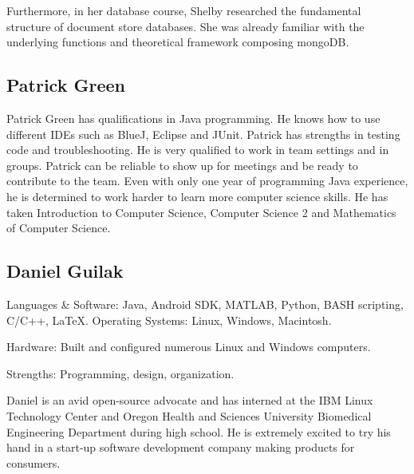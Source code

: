 \documentclass[letterpaper,12pt]{article}
\begin{document}
	Furthermore, in her database course, Shelby researched the fundamental structure of document store databases. She was already familiar with the underlying functions and theoretical framework composing mongoDB.
\subsection{Patrick Green}
	Patrick Green has qualifications in Java programming. He knows how to use different IDEs such as BlueJ, Eclipse and JUnit. Patrick has strengths in testing code and troubleshooting. He is very qualified to work in team settings and in groups. Patrick can be reliable to show up for meetings and be ready to contribute to the team. Even with only one year of programming Java experience, he is determined to work harder to learn more computer science skills. He has taken Introduction to Computer Science, Computer Science 2 and Mathematics of Computer Science.
\subsection{Daniel Guilak}
Languages \& Software: Java, Android SDK, MATLAB, Python, BASH scripting, C/C++, \LaTeX.
Operating Systems: Linux, Windows, Macintosh.

Hardware: Built and configured numerous Linux and Windows computers.

Strengths: Programming, design, organization.

	Daniel is an avid open-source advocate and has interned at the IBM Linux Technology Center and Oregon Health and Sciences University Biomedical Engineering Department during high school. He is extremely excited to try his hand in a start-up software development company making products for consumers.
\end{document}
